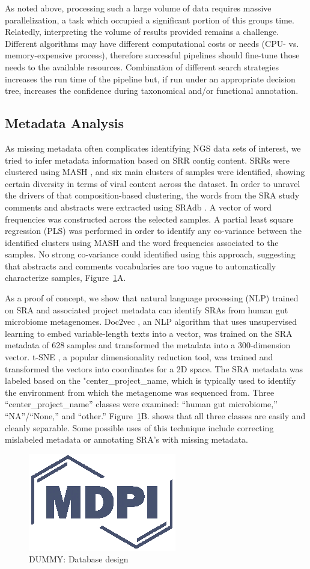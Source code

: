   As noted above, processing such a large volume of data requires massive
  parallelization, a task which occupied a significant portion of this groups
  time. Relatedly, interpreting the volume of results provided remains a
  challenge. Different algorithms may have different computational costs or
  needs (CPU- vs. memory-expensive process), therefore successful pipelines
  should fine-tune those needs to the available resources. Combination of
  different search strategies increases the run time of the pipeline but, if
  run under an appropriate decision tree, increases the confidence during
  taxonomical and/or functional annotation.

  \subsection{Metadata Analysis} As missing metadata often complicates
  identifying NGS data sets of interest, we tried to infer metadata information
  based on SRR contig content. SRRs were clustered using MASH \cite{Ondov2019},
  and six main clusters of samples were identified, showing certain diversity
  in terms of viral content across the dataset. In order to unravel the drivers
  of that composition-based clustering, the words from the SRA study comments
  and abstracts were extracted using SRAdb \cite{Zhu2013}. A vector of word
  frequencies was constructed across the selected samples. A partial least
  square regression (PLS) was performed in order to identify any co-variance
  between the identified clusters using MASH and the word frequencies
  associated to the samples. No strong co-variance could identified using this
  approach, suggesting that abstracts and comments vocabularies are too vague
  to automatically characterize samples, Figure~\ref{fig:metadata}A.

  As a proof of concept, we show that natural language processing (NLP) trained
  on SRA and associated project metadata can identify SRAs from human gut
  microbiome metagenomes. Doc2vec \cite{Le2014}, an NLP algorithm that uses
  unsupervised learning to embed variable-length texts into a vector, was
  trained on the SRA metadata of 628 samples and transformed the metadata into
  a 300-dimension vector. t-SNE \cite{vanDerMaaten2008}, a popular
  dimensionality reduction tool, was trained and transformed the vectors into
  coordinates for a 2D space. The SRA metadata was labeled based on the
  "center\_project\_name, which is typically used to identify the environment
  from which the metagenome was sequenced from. Three “center\_project\_name”
  classes were examined: “human gut microbiome,” “NA”/“None,” and “other.”
  Figure~\ref{fig:metadata}B. shows that all three classes are easily and
  cleanly separable. Some possible uses of this technique include correcting
  mislabeled metadata or annotating SRA’s with missing metadata.

  \begin{figure}
    \centering
    \includegraphics{Definitions/logo-mdpi}
    \caption{DUMMY: Database design
            \label{fig:metadata}}
  \end{figure}
